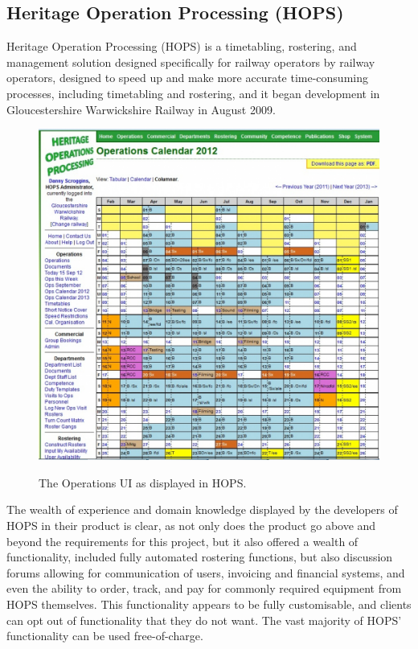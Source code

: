 \subsection{Heritage Operation Processing (HOPS)}
Heritage Operation Processing (HOPS) is a timetabling, rostering, and management solution designed specifically for railway operators by railway operators, designed to speed up and make more accurate time-consuming processes, including timetabling and rostering, and it began development in Gloucestershire Warwickshire Railway in August 2009. \cite{Hops1}

\begin{figure}[!ht]
    \includegraphics[width=\textwidth]{Figures/hops-operations}
    \caption{The Operations UI as displayed in HOPS.}
    \label{fig:hops} \cite{Hops3}
\end{figure}

The wealth of experience and domain knowledge displayed by the developers of HOPS in their product is clear, as not only does the product go above and beyond the requirements for this project, but it also offered a wealth of functionality, included fully automated rostering functions, but also discussion forums allowing for communication of users, invoicing and financial systems, and even the ability to order, track, and pay for commonly required equipment from HOPS themselves. This functionality appears to be fully customisable, and clients can opt out of functionality that they do not want. The vast majority of HOPS' functionality can be used free-of-charge. \cite{Hops1} \cite{Hops2}


